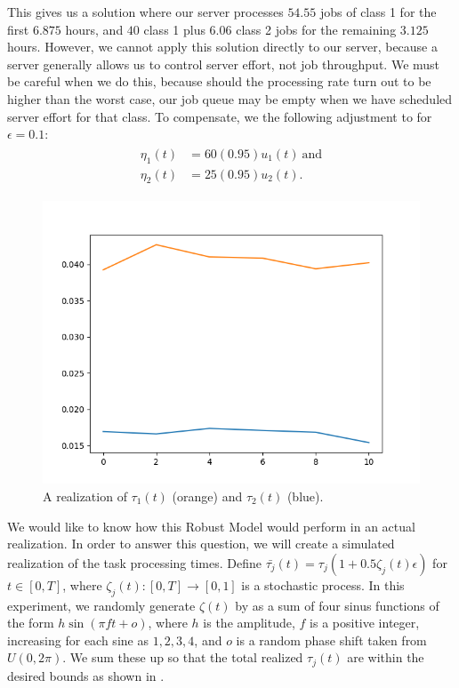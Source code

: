 \documentclass[11pt,a4paper,titlepage]{article}
\theoremstyle{definition}
\theoremstyle{plain}
\begin{document}
    This gives us a solution where our server processes $54.55$
    jobs of class 1 for the first $6.875$ hours,
    and $40$ class 1 plus $6.06$ class 2 jobs for the remaining $3.125$ hours.
    However,
    we cannot apply this solution directly to our server,
    because a server generally allows us to control server effort,
    not job throughput.
    We must be careful when we do this,
    because should the processing rate turn out to be higher than the worst case,
    our job queue may be empty when we have scheduled server effort for that class.
    To compensate,
    we the following adjustment to  for $\epsilon=0.1$:
    \begin{align}
        \label{eq:model-2-translation-robust}
        \begin{split}
            \eta_1(t) & = 60(0.95) u_1(t) ~ \text{and} \\
            \eta_2(t) & = 25(0.95) u_2(t).
        \end{split}
    \end{align}

    \begin{figure}
        \centering
        \includegraphics{tau_t.png}
        \caption{A realization of $\tau_1(t)$ (orange) and $\tau_2(t)$ (blue).}
        \label{fig:tau-realization}
    \end{figure}

    We would like to know how this Robust Model would perform in an actual realization.
    In order to answer this question,
    we will create a simulated realization of the task processing times.
    Define
    $\bar{\tau_j}(t) = \tau_j (1 + 0.5\zeta_j(t) \epsilon)$
    for $t \in [0,T]$,
    where $\zeta_j(t):[0,T] \to [0,1]$ is a stochastic process.
    In this experiment,
    we randomly generate $\zeta(t)$ by as a sum of four sinus functions of the form $h \sin(\pi f t + o)$,
    where $h$ is the amplitude,
    $f$ is a positive integer,
    increasing for each sine as $1,2,3,4$,
    and $o$ is a random phase shift taken  from $U(0,2\pi)$.
    We sum these up so that the total realized $\tau_j(t)$ are within the desired bounds as shown in .
\end{document}
